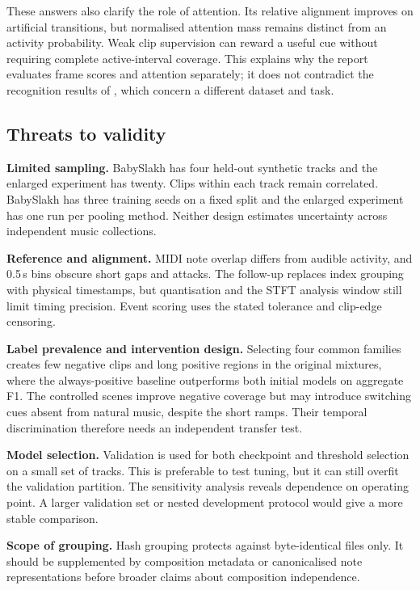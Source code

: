 \documentclass[10pt,a4paper]{article}
\begin{document}
These answers also clarify the role of attention. Its relative alignment improves on artificial transitions, but normalised attention mass remains distinct from an activity probability. Weak clip supervision can reward a useful cue without requiring complete active-interval coverage. This explains why the report evaluates frame scores and attention separately; it does not contradict the recognition results of \cite{attentionmic}, which concern a different dataset and task.

\subsection{Threats to validity}
\textbf{Limited sampling.} BabySlakh has four held-out synthetic tracks and the enlarged experiment has twenty. Clips within each track remain correlated. BabySlakh has three training seeds on a fixed split and the enlarged experiment has one run per pooling method. Neither design estimates uncertainty across independent music collections.

\textbf{Reference and alignment.} MIDI note overlap differs from audible activity, and 0.5\,s bins obscure short gaps and attacks. The follow-up replaces index grouping with physical timestamps, but quantisation and the STFT analysis window still limit timing precision. Event scoring uses the stated tolerance and clip-edge censoring.

\begin{samepage}
\textbf{Label prevalence and intervention design.} Selecting four common families creates few negative clips and long positive regions in the original mixtures, where the always-positive baseline outperforms both initial models on aggregate F1. The controlled scenes improve negative coverage but may introduce switching cues absent from natural music, despite the short ramps. Their temporal discrimination therefore needs an independent transfer test.
\par\end{samepage}

\textbf{Model selection.} Validation is used for both checkpoint and threshold selection on a small set of tracks. This is preferable to test tuning, but it can still overfit the validation partition. The sensitivity analysis reveals dependence on operating point. A larger validation set or nested development protocol would give a more stable comparison.

\textbf{Scope of grouping.} Hash grouping protects against byte-identical files only. It should be supplemented by composition metadata or canonicalised note representations before broader claims about composition independence.
\end{document}
